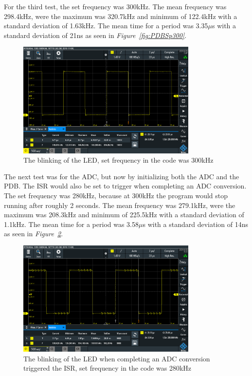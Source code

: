 For the third test, the set frequency was 300kHz.
The mean frequency was 298.4kHz, were the maximum was 320.7kHz and minimum of 122.4kHz with a standard deviation of 1.63kHz. 
The mean time for a period was 3.35$\mu$s with a standard deviation of 21ns as seen in \textit{Figure~\ref{fig:PDBSp300}}.

\begin{figure}[h]
    \centering
    \includegraphics[width=0.8\textwidth]{graphics/STAT03_300.PNG}
    \caption{The blinking of the LED, set frequency in the code was 300kHz}
    \label{fig:PDBsp300}
\end{figure}

The next test was for the ADC, but now by initializing both the ADC and the PDB.
The ISR would also be set to trigger when completing an ADC conversion.
The set frequency was 280kHz, because at 300kHz the program would stop running after roughly 2 seconds.
The mean frequency was 279.1kHz, were the maximum was 208.3kHz and  minimum of 225.5kHz with a standard deviation of 1.1kHz. 
The mean time for a period was 3.58$\mu$s with a standard deviation of 14ns as seen in \textit{Figure~\ref{fig:PDBADCDMAsp280}}.

\begin{figure}[h]
    \centering
    \includegraphics[width=0.8\textwidth]{graphics/STATADC_280.PNG}
    \caption{The blinking of the LED when completing an ADC conversion triggered the ISR, set frequency in the code was 280kHz}
    \label{fig:PDBADCDMAsp280}
\end{figure}

